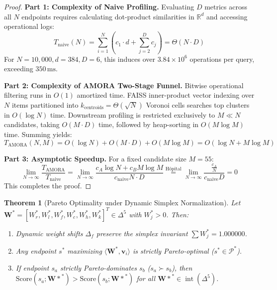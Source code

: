 \documentclass[conference,onecolumn,10pt]{IEEEtran}
\newtheorem{theorem}{Theorem}
\begin{document}
\begin{proof}
\textbf{Part 1: Complexity of Naive Profiling.}
Evaluating $D$ metrics across all $N$ endpoints requires calculating dot-product similarities in $\mathbb{R}^d$ and accessing operational logs:
\begin{equation}
    T_{\text{naive}}(N) = \sum_{i=1}^N \left( c_1 \cdot d + \sum_{j=2}^D c_j \right) = \Theta(N \cdot D)
\end{equation}
For $N = 10{,}000, d = 384, D = 6$, this induces over $3.84 \times 10^6$ operations per query, exceeding $350\,\text{ms}$.

\textbf{Part 2: Complexity of AMORA Two-Stage Funnel.}
Bitwise operational filtering runs in $O(1)$ amortized time. FAISS inner-product vector indexing over $N$ items partitioned into $k_{\text{centroids}} = \Theta(\sqrt{N})$ Voronoi cells searches top clusters in $O(\log N)$ time. Downstream profiling is restricted exclusively to $M \ll N$ candidates, taking $O(M \cdot D)$ time, followed by heap-sorting in $O(M \log M)$ time. Summing yields:
\begin{equation}
    T_{\text{AMORA}}(N, M) = O(\log N) + O(M \cdot D) + O(M \log M) = O(\log N + M \log M)
\end{equation}

\textbf{Part 3: Asymptotic Speedup.}
For a fixed candidate size $M = 55$:
\begin{equation}
    \lim_{N \to \infty} \frac{T_{\text{AMORA}}}{T_{\text{naive}}} = \lim_{N \to \infty} \frac{c_A \log N + c_B M \log M}{c_{\text{naive}} N \cdot D} \stackrel{\text{H\^{o}pital}}{=} \lim_{N \to \infty} \frac{\frac{c_A}{N}}{c_{\text{naive}} D} = 0
\end{equation}
This completes the proof.
\end{proof}

\begin{theorem}[Pareto Optimality under Dynamic Simplex Normalization]
\label{thm:pareto}
Let $\mathbf{W}^* = [W_r^*, W_l^*, W_f^*, W_c^*, W_h^*, W_k^*]^T \in \Delta^5$ with $W_j^* > 0$. Then:
\begin{enumerate}
    \item Dynamic weight shifts $\Delta_f$ preserve the simplex invariant $\sum W_j^* = 1.000000$.
    \item Any endpoint $s^*$ maximizing $\langle \mathbf{W}^*, \mathbf{v}_i \rangle$ is strictly Pareto-optimal ($s^* \in \mathcal{P}^*$).
    \item If endpoint $s_a$ strictly Pareto-dominates $s_b$ ($s_a \succ s_b$), then $\text{Score}(s_a; \mathbf{W*}^*) > \text{Score}(s_b; \mathbf{W*}^*)$ for all $\mathbf{W*}^* \in \operatorname{int}(\Delta^5)$.
\end{enumerate}
\end{theorem}
\end{document}
